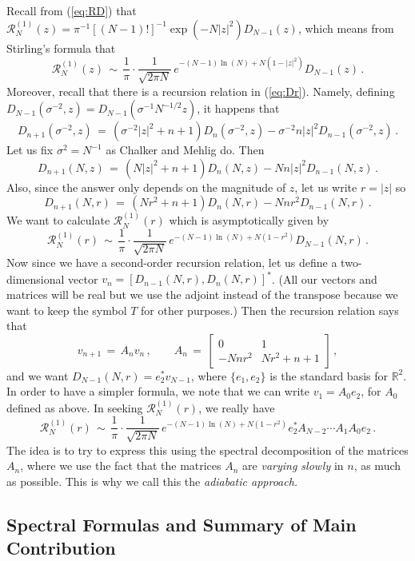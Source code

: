 \documentclass[12pt]{report}
\newcommand{\R}{\mathbb{R}}
\newcommand{\be}{\begin{equation}}
\newcommand{\ee}{\end{equation}}
\theoremstyle{definition}
\begin{document}
Recall from (\ref{eq:RD}) that $\mathcal{R}_N^{(1)}(z) = \pi^{-1} [(N-1)!]^{-1} \exp(-N |z|^2) D_{N-1}(z)$, which means from Stirling's formula that
\be
\mathcal{R}_N^{(1)}(z)\, \sim\, \frac{1}{\pi} \cdot \frac{1}{\sqrt{2 \pi N}}\, e^{-(N-1)\ln(N)+N(1-|z|^2)} D_{N-1}(z)\, .
\ee
Moreover, recall that there is a recursion relation in (\ref{eq:Dr}). Namely, defining $D_{N-1}(\sigma^{-2},z) = D_{N-1}(\sigma^{-1}N^{-1/2}z)$,
it happens that
$$
D_{n+1}(\sigma^{-2},z)\, =\, (\sigma^{-2}|z|^2+n+1) D_n(\sigma^{-2},z)-\sigma^{-2}n|z|^2D_{n-1}(\sigma^{-2},z)\, .
$$
Let us fix $\sigma^2=N^{-1}$ as Chalker and Mehlig do.
Then
\be
D_{n+1}(N,z)\, =\, (N|z|^2+n+1) D_n(N,z)-Nn|z|^2D_{n-1}(N,z)\, .
\ee
Also, since the answer only depends on the magnitude of $z$, let us write $r=|z|$ so
\be
D_{n+1}(N,r)\, =\, (Nr^2+n+1) D_n(N,r)-Nnr^2D_{n-1}(N,r)\, .
\ee
We want to calculate $\mathcal{R}_N^{(1)}(r)$ which is asymptotically given by
\be
\mathcal{R}_N^{(1)}(r)\, \sim\, \frac{1}{\pi} \cdot \frac{1}{\sqrt{2 \pi N}}\, e^{-(N-1)\ln(N)+N(1-r^2)} D_{N-1}(N,r)\, .
\ee
Now since we have a second-order recursion relation, let us define a two-dimensional vector $v_n = [D_{n-1}(N,r),D_n(N,r)]^*$.
(All our vectors and matrices will be real but we use the adjoint instead of the transpose because we want to keep the symbol
$T$ for other purposes.)
Then the recursion relation says that
\be
v_{n+1}\, =\, A_n v_n\, ,\qquad
A_n\, =\, 
\begin{bmatrix} 0 & 1 \\
-Nnr^2 & N r^2+n+1
\end{bmatrix}\, ,
\ee
and we want $D_{N-1}(N,r) = e_2^* v_{N-1}$, where $\{e_1,e_2\}$ is the standard basis for $\R^2$.
In order to have a simpler formula, we note that we can write $v_1 = A_0 e_2$, for $A_0$ defined as above. 
In seeking $\mathcal{R}_N^{(1)}(r)$, we really have
\be
\mathcal{R}_N^{(1)}(r)\, \sim\, \frac{1}{\pi} \cdot \frac{1}{\sqrt{2 \pi N}} \, e^{-(N-1)\ln(N)+N(1-r^2)} e_2^* A_{N-2} \cdots A_1 A_0 e_2\, .
\ee
The idea is to try to express this using the spectral decomposition of the matrices $A_n$,
where we use the fact that the matrices $A_n$ are {\em varying slowly} in $n$, as much as possible.
This is why we call this the {\em adiabatic approach.}

\subsection{Spectral Formulas and Summary of Main Contribution}
\end{document}
